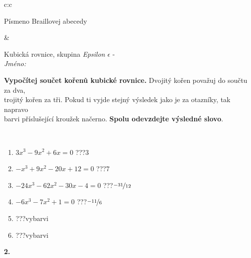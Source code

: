 \documentclass[10pt]{report}
\begin{document}
\begin{tabular}{c:c}
\begin{minipage}[c][104.5mm][t]{0.5\linewidth}
\begin{center}
\begin{minipage}{0.20\linewidth}
\begin{center}
{\small Písmeno Braillovej abecedy}
\end{center}
\end{minipage}
\end{center}
\end{minipage}
&
\begin{minipage}[c][104.5mm][t]{0.5\linewidth}
\begin{center}
\vspace{7mm}
{\huge Kubická rovnice, skupina \textit{Epsilon $\epsilon$} -}\\[5mm]
\textit{Jméno:}\phantom{xxxxxxxxxxxxxxxxxxxxxxxxxxxxxxxxxxxxxxxxxxxxxxxxxxxxxxxxxxxxxxxxx}\\[5mm]
\begin{minipage}{0.95\linewidth}
\begin{center}
\textbf{Vypočítej součet kořenů kubické rovnice.} Dvojitý kořen považuj do součtu za dva,\\trojitý kořen za tři. Pokud ti vyjde stejný výsledek jako je za otazníky, tak napravo\\barvi příslušející kroužek načerno. \textbf{Spolu odevzdejte výsledné slovo}.
\end{center}
\end{minipage}
\\[1mm]
\begin{minipage}{0.79\linewidth}
\begin{center}
\begin{varwidth}{\linewidth}
\begin{enumerate}
\Large
\item $3x^3-9x^2+6x=0$\quad \dotfill\; ???\;\dotfill \quad $3$
\item $-x^3+9x^2-20x+12=0$\quad \dotfill\; ???\;\dotfill \quad $7$
\item $-24x^3-62x^2-30x-4=0$\quad \dotfill\; ???\;\dotfill \quad $\nicefrac{-31}{12}$
\item $-6x^3-7x^2+1=0$\quad \dotfill\; ???\;\dotfill \quad $\nicefrac{-11}{6}$
\item \quad \dotfill\; ???\;\dotfill \quad vybarvi
\item \quad \dotfill\; ???\;\dotfill \quad vybarvi
\end{enumerate}
\end{varwidth}
\end{center}
\end{minipage}
\begin{minipage}{0.20\linewidth}
\begin{center}
{\Huge\bfseries 2.} \\[2mm]

\end{center}
\end{minipage}
\end{center}
\end{minipage}
\end{tabular}
\end{document}
